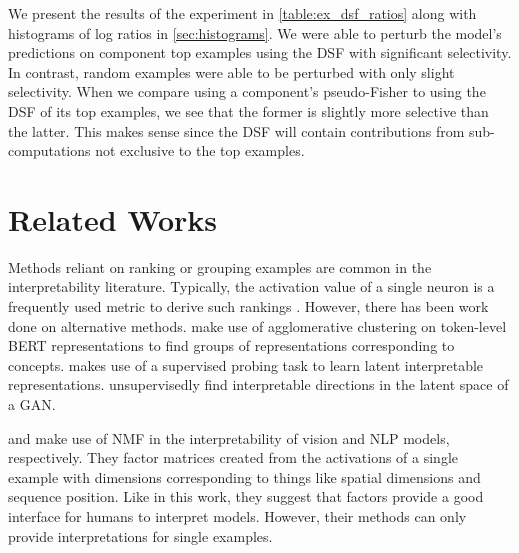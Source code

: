 \documentclass[dvipsnames]{article}
\begin{document}
We present the results of the experiment in \cref{table:ex_dsf_ratios} along with histograms of log ratios in \cref{sec:histograms}.
We were able to perturb the model's predictions on component top examples using the DSF with significant selectivity.
In contrast, random examples were able to be perturbed with only slight selectivity.
When we compare using a component's pseudo-Fisher to using the DSF of its top examples, we see that the former is slightly more selective than the latter.
This makes sense since the DSF will contain contributions from sub-computations not exclusive to the top examples.




\section{Related Works}
Methods reliant on ranking or grouping examples are common in the interpretability literature.
Typically, the activation value of a single neuron is a frequently used metric to derive such rankings \citep{sajjad2022neuron, bolukbasi2021interpretability, bau2017network, szegedy2013intriguing}.
However, there has been work done on alternative methods.
 make use of agglomerative clustering on token-level BERT representations to find groups of representations corresponding to concepts.
 makes use of a supervised probing task to learn latent interpretable representations.
 unsupervisedly find interpretable directions in the latent space of a GAN.


 and \citet{alammar2020explaining} make use of NMF in the interpretability of vision and NLP models, respectively.
They factor matrices created from the activations of a single example with dimensions corresponding to things like spatial dimensions and sequence position.
Like in this work, they suggest that factors provide a good interface for humans to interpret models.
However, their methods can only provide interpretations for single examples.
\end{document}
